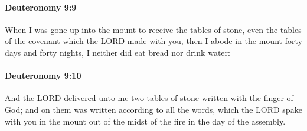 		\paragraph{Deuteronomy 9:9} %
			\label{DEUTERONOMY-9-9}

			When I was gone up into the mount to receive the tables of stone, even the tables of the covenant which the LORD made with you, then I abode in the mount forty days and forty nights, I neither did eat bread nor drink water:


		\paragraph{Deuteronomy 9:10} %
			\label{DEUTERONOMY-9-10}

			And the LORD delivered unto me two tables of stone written with the finger of God; and on them was written according to all the words, which the LORD spake with you in the mount out of the midst of the fire in the day of the assembly.

